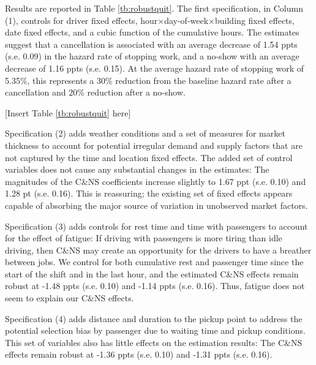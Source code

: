 \documentclass[reviewmode,AEJ]{AEA}
\begin{document}
Results %
are reported in Table \ref{tb:robustquit}. 
The first specification, in Column (1), controls for driver fixed effects, hour\(\times\)day-of-week\(\times\)building fixed effects, date fixed effects, and a cubic function of the cumulative hours. The estimates %
suggest that a cancellation is associated with an average decrease of 1.54 ppts (s.e. 0.09) in the hazard rate of stopping work, and a no-show with an average decrease
of 1.16 ppts (s.e. 0.15). At the average hazard rate of stopping work of 5.35\%, this represents a 30\% reduction from the baseline hazard rate after a cancellation and 20\% reduction after a no-show.

\begin{center}
	[Insert Table \ref{tb:robustquit} here]
\end{center}

Specification (2) adds weather conditions and a set of measures for market thickness to account for potential irregular demand and supply factors that are not captured by the time and location fixed effects. The added set of control variables does not cause any substantial changes in the estimates: The magnitudes of the C\&NS coefficients increase slightly to 1.67 ppt (s.e. 0.10) and 1.28 pt (s.e. 0.16). This is reassuring; the existing set of fixed effects appears capable of absorbing the major source of variation in unobserved market factors.

Specification (3) adds controls for rest time and time with passengers %
 to account for the effect of fatigue: If driving with passengers %
is more tiring than idle driving, then C\&NS may create an opportunity for the drivers to have a breather between jobs. We control for both cumulative rest and passenger time since the start of the shift and in the last hour, and the estimated C\&NS effects remain robust at -1.48 ppts (s.e. 0.10) and -1.14 ppts (s.e. 0.16). Thus, fatigue does not seem to explain our C\&NS effects. %

Specification (4) adds distance and duration to the pickup point to address the potential selection bias by passenger due to waiting time and pickup conditions. This set of variables also has little effects on the estimation results: The C\&NS effects remain robust at -1.36 ppts (s.e. 0.10) and -1.31 ppts (s.e. 0.16).
\end{document}
